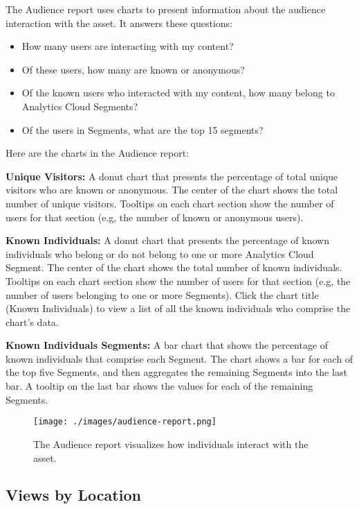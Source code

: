 The Audience report uses charts to present information about the
audience interaction with the asset. It answers these questions:

\begin{itemize}
\tightlist
\item
  How many users are interacting with my content?
\item
  Of these users, how many are known or anonymous?
\item
  Of the known users who interacted with my content, how many belong to
  Analytics Cloud Segments?
\item
  Of the users in Segments, what are the top 15 segments?
\end{itemize}

Here are the charts in the Audience report:

\textbf{Unique Visitors:} A donut chart that presents the percentage of
total unique visitors who are known or anonymous. The center of the
chart shows the total number of unique visitors. Tooltips on each chart
section show the number of users for that section (e.g, the number of
known or anonymous users).

\textbf{Known Individuals:} A donut chart that presents the percentage
of known individuals who belong or do not belong to one or more
Analytics Cloud Segment. The center of the chart shows the total number
of known individuals. Tooltips on each chart section show the number of
users for that section (e.g, the number of users belonging to one or
more Segments). Click the chart title (Known Individuals) to view a list
of all the known individuals who comprise the chart's data.

\textbf{Known Individuals Segments:} A bar chart that shows the
percentage of known individuals that comprise each Segment. The chart
shows a bar for each of the top five Segments, and then aggregates the
remaining Segments into the last bar. A tooltip on the last bar shows
the values for each of the remaining Segments.

\begin{figure}
\centering
\texttt{[image: ./images/audience-report.png]}
\caption{The Audience report visualizes how individuals interact with
the asset.}
\end{figure}

\subsection{Views by Location}\label{views-by-location-1}

